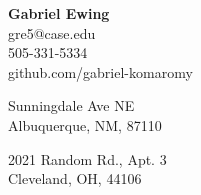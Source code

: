 \documentclass[11pt]{article}
\begin{document}
\newcommand{\ressection}[1]{\setul{2pt}{.4pt}\large{\textbf{\ul{#1}}\\[0.3\baselineskip]}}
\newcommand{\eosec}[0]{~\\[0.6\baselineskip]}

\begin{center}\Large{\textbf{Gabriel Ewing}}\\[0.5\baselineskip]
    \large{gre5@case.edu}\\
    \large{505-331-5334}\\
    github.com/gabriel-komaromy
\end{center}
\begin{paracol}{2}
    \begin{flushleft}
     Sunningdale Ave NE\\
    Albuquerque, NM, 87110
\end{flushleft}
    \switchcolumn
    \noindent \begin{flushright}2021 Random Rd., Apt. 3\\
    Cleveland, OH, 44106\end{flushright}
\end{paracol}
\end{document}
